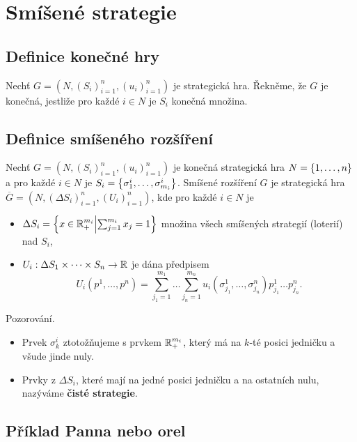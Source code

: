 \section{Smíšené strategie}
\subsection{Definice konečné hry}
Nechť $G = (N, (S_i)_{i=1}^n, (u_i)_{i=1}^n)$ je strategická hra. Řekněme, že $G$ je konečná, jestliže pro každé 
$i \in N$ je $S_i$ konečná množina.

\subsection{Definice smíšeného rozšíření}
Nechť $G = (N, (S_i)_{i=1}^n, (u_i)_{i=1}^n)$ je konečná strategická hra $N = \left\lbrace 1, \dots, n \right\rbrace$ a pro každé $i \in N$ je
$S_i = \left\lbrace \sigma_1^i, \dots, \sigma_{m_i}^i \right\rbrace$. Smíšené rozšíření $G$ je strategická hra 
$\overline{G} = (N, (\Delta S_i)_{i=1}^n, (U_i)_{i=1}^n)$, kde pro každé $i \in N$ je
\begin{itemize}
    \item $\Delta S_i = \left\lbrace x \in \mathbb{R}_+^{m_i} \middle| \sum_{j=1}^{m_i}x_j = 1 \right\rbrace$ množina všech smíšených strategií 
    (loterií) nad $S_i$,
    \item $U_i : \Delta S_1 \times \dots \times S_n \rightarrow \mathbb{R}$ je dána předpisem
    \[
        U_i (p^1, \dots, p^n) = \sum_{j_1 = 1}^{m_1} \dots \sum_{j_n=1}^{m_n} u_i(\sigma_{j_1}^1, \dots, \sigma_{j_n}^n)
        p_{j_1}^1 \dots p_{j_n}^n.
    \]
\end{itemize}
Pozorování.
\begin{itemize}
    \item Prvek $\sigma_k^i$ ztotožňujeme s prvkem $\mathbb{R}_+^{m_i}$, který má na $k$-té posici jedničku a všude jinde nuly.
    \item Prvky z $\Delta S_i$, které mají na jedné posici jedničku a na ostatních nulu, nazýváme 
    \textbf{čisté strategie}.
\end{itemize}

\subsection{Příklad Panna nebo orel}

